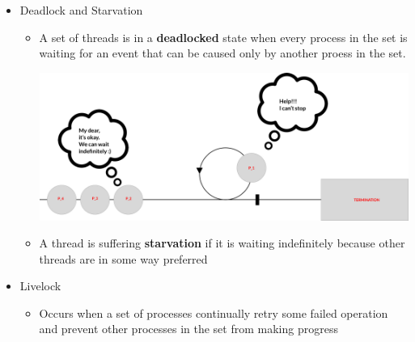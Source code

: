 \documentclass[12pt]{article}
\begin{document}
\begin{itemize}
    \item Deadlock and Starvation
    \begin{itemize}
        \item A set of threads is in a \textbf{deadlocked} state when every process in the
        set is waiting for an event that can be caused only by another proess in the
        set.

        \begin{center}
            \includegraphics[width=\linewidth]{images/week_10_notes_1_4.png}
        \end{center}

        \item A thread is suffering \textbf{starvation} if it is waiting indefinitely
        because other threads are in some way preferred
    \end{itemize}

    \bigskip


    \item Livelock
    \begin{itemize}
        \item Occurs when a set of processes continually retry some failed operation
        and prevent other processes in the set from making progress


\end{itemize}
\end{itemize}
\end{document}

